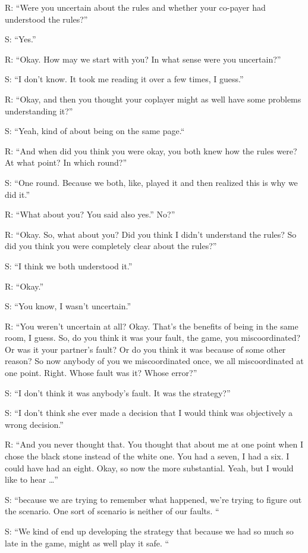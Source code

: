\documentclass[a4paper,superscriptaddress,nofootinbib]{revtex4}
\begin{document}
R: “Were you uncertain about the rules and whether your co-payer had understood the rules?” 

S: “Yes.”

R: “Okay. How may we start with you? In what sense were you uncertain?” 

S: “I don't know. It took me reading it over a few times, I guess.” 

R: “Okay, and then you thought your coplayer might as well have some problems understanding it?”

S: “Yeah, kind of about being on the same page.“

R: “And when did you think you were okay, you both knew how the rules were? At what point? In which round?”

S: “One round. Because we both, like, played it and then realized this is why we did it.” 

R: “What about you? You said also yes.” No?”

R: “Okay. So, what about you? Did you think I didn't understand the rules? So did you think you were completely clear about the rules?” 

S: “I think we both understood it.” 

R: “Okay.” 

S: “You know, I wasn't uncertain.”

R: “You weren’t uncertain at all? Okay. That's the benefits of being in the same room, I guess. So, do you think it was your fault, the game, you miscoordinated? Or was it your partner's fault? Or do you think it was because of some other reason? So now anybody of you we miscoordinated once, we all miscoordinated at one point. Right. Whose fault was it? Whose error?”

S: “I don’t think it was anybody’s fault. It was the strategy?” 

S: “I don't think she ever made a decision that I would think was objectively a wrong decision.” 

R: “And you never thought that. You thought that about me at one point when I chose the black stone instead of the white one. You had a seven, I had a six. I could have had an eight. Okay, so now the more substantial. Yeah, but I would like to hear …”

S: “because we are trying to remember what happened, we're trying to figure out the scenario. One sort of scenario is neither of our faults. “

S: “We kind of end up developing the strategy that because we had so much so late in the game, might as well play it safe. “
\end{document}
